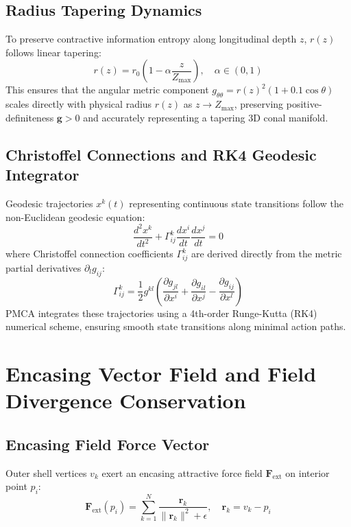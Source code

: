 \documentclass[10pt,journal,compsoc]{IEEEtran}
\begin{document}
\subsection{Radius Tapering Dynamics}
To preserve contractive information entropy along longitudinal depth $z$, $r(z)$ follows linear tapering:
\begin{equation}
r(z) = r_0 \left(1 - \alpha \frac{z}{Z_{\text{max}}}\right), \quad \alpha \in (0, 1)
\end{equation}
This ensures that the angular metric component $g_{\theta\theta} = r(z)^2 (1 + 0.1 \cos\theta)$ scales directly with physical radius $r(z)$ as $z \to Z_{\text{max}}$, preserving positive-definiteness $\mathbf{g} > 0$ and accurately representing a tapering 3D conal manifold.

\subsection{Christoffel Connections and RK4 Geodesic Integrator}
Geodesic trajectories $x^k(t)$ representing continuous state transitions follow the non-Euclidean geodesic equation:
\begin{equation}
\frac{d^2 x^k}{dt^2} + \Gamma^k_{ij} \frac{dx^i}{dt} \frac{dx^j}{dt} = 0
\end{equation}
where Christoffel connection coefficients $\Gamma^k_{ij}$ are derived directly from the metric partial derivatives $\partial_l g_{ij}$:
\begin{equation}
\Gamma^k_{ij} = \frac{1}{2} g^{kl} \left(\frac{\partial g_{jl}}{\partial x^i} + \frac{\partial g_{il}}{\partial x^j} - \frac{\partial g_{ij}}{\partial x^l}\right)
\end{equation}
PMCA integrates these trajectories using a 4th-order Runge-Kutta (RK4) numerical scheme, ensuring smooth state transitions along minimal action paths.

\section{Encasing Vector Field and Field Divergence Conservation}
\subsection{Encasing Field Force Vector}
Outer shell vertices $v_k$ exert an encasing attractive force field $\mathbf{F}_{\text{ext}}$ on interior point $p_i$:
\begin{equation}
\mathbf{F}_{\text{ext}}(p_i) = \sum_{k=1}^N \frac{\mathbf{r}_k}{\|\mathbf{r}_k\|^2 + \epsilon}, \quad \mathbf{r}_k = v_k - p_i
\end{equation}
\end{document}
